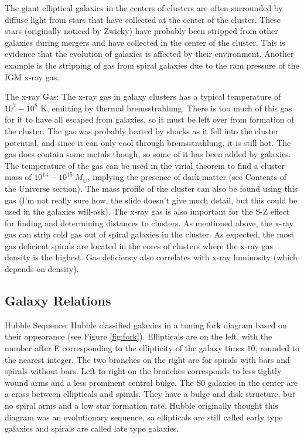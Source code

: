 The giant elliptical galaxies in the centers of clusters are often surrounded 
by diffuse light from stars that have collected at the center of the cluster.  
These stars (originally noticed by Zwicky) have probably been 
stripped from other galaxies during mergers and have collected in the center 
of the cluster.  This is evidence that the evolution of galaxies is affected 
by their environment.  Another example is the stripping of gas from spiral 
galaxies due to the ram pressure of the IGM x-ray gas.  

The x-ray Gas:\newline
The x-ray gas in galaxy clusters has a typical temperature of $10^7-10^8$ K, 
emitting by thermal bremsstrahlung.  There is too much of this gas for it 
to have all escaped from galaxies, so it must be left over from formation of 
the cluster.  The gas was probably heated by shocks as it fell into the cluster 
potential, and since it can only cool through bremsstrahlung, it is still hot.  
The gas does contain some metals though, so some of it has been added by 
galaxies.  The temperature of the gas can be used in the virial theorem to 
find a cluster mass of $10^{14}-10^{15}\ M_{\odot}$, implying the presence of 
dark matter (see Contents of the Universe section).  The mass profile of the 
cluster can also be found using this gas (I'm not really sure how, the slide 
doesn't give much detail, but this could be used in the galaxies will-ask).  
The x-ray gas is also important for the S-Z effect for finding and determining 
distances to clusters.  As mentioned above, the x-ray gas can strip cold gas 
out of spiral galaxies in the cluster.  As expected, the most gas 
deficient spirals are located in the cores of clusters where the x-ray gas 
density is the highest.  Gas deficiency also correlates with x-ray luminosity 
(which depends on density). 

\subsection{Galaxy Relations}
Hubble Sequence:\newline
Hubble classified galaxies in a tuning fork diagram based on their appearance 
(see Figure \ref{fig:fork}).  Ellipticals are on the left, with the number 
after E corresponding to the ellipticity of the galaxy times $10$, rounded to 
the nearest integer.  The two branches on the right are for spirals with bars 
and spirals without bars.  Left to right on the branches corresponds to 
less tightly wound arms and a less prominent central bulge.  The S$0$ galaxies 
in the center are a cross between ellipticals and spirals.  They have a bulge 
and disk structure, but no spiral arms and a low star formation rate.  Hubble 
originally thought this diagram was an evolutionary sequence, so ellipticals 
are still called early type galaxies and spirals are called late type 
galaxies.  

